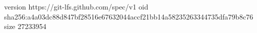 version https://git-lfs.github.com/spec/v1
oid sha256:a4a03dc88d847bf28516e67632044accf21bb14a58235263344735dfa79b8c76
size 27233954
